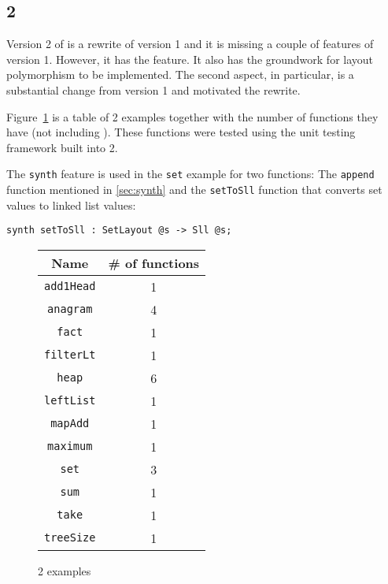 \subsection{\Pika{} 2}

Version 2 of \Pika{} is a rewrite of version 1 and it is missing a couple of features of version 1. However, it has the \synth{} feature. It also has the groundwork for layout polymorphism to be implemented. The second aspect, in particular, is a substantial change from version 1 and motivated the rewrite.

Figure~\ref{fig:pika-2-examples} is a table of \Pika{} 2 examples together with the number of functions they have (not including \synth). These functions were tested using the unit testing framework built into \Pika{} 2.

The \lstinline[language=Pika]{synth} feature is used in the \verb|set| example for two functions: The \verb|append| function mentioned in \autoref{sec:synth} and the
\verb|setToSll| function that converts set values to linked list values:

\begin{lstlisting}[language=Pika]
synth setToSll : SetLayout @s -> Sll @s;
\end{lstlisting}

\begin{figure}
  \begin{tabular}{|c|c|}
    \hline
    Name & \# of functions\\
    \hline
    \verb|add1Head| & 1\\
    \verb|anagram| & 4\\
    \verb|fact| & 1\\
    \verb|filterLt| & 1\\
    \verb|heap| & 6\\
    \verb|leftList| & 1\\
    \verb|mapAdd| & 1\\
    \verb|maximum| & 1\\
    \verb|set| & 3\\
    \verb|sum| & 1\\
    \verb|take| & 1\\
    \verb|treeSize| & 1\\
    \hline
  \end{tabular}
  \caption{\Pika{} 2 examples}
  \label{fig:pika-2-examples}
\end{figure}                   

